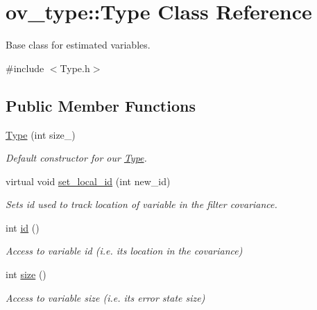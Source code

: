 \hypertarget{classov__type_1_1Type}{}\section{ov\+\_\+type\+:\+:Type Class Reference}
\label{classov__type_1_1Type}


Base class for estimated variables.  




{\ttfamily \#include $<$Type.\+h$>$}

\subsection*{Public Member Functions}
\begin{DoxyCompactItemize}
\item 
\hyperlink{classov__type_1_1Type_a512525c192c9bd721e13eef0cb707496}{Type} (int size\+\_\+)
\begin{DoxyCompactList}\small\item\em Default constructor for our \hyperlink{classov__type_1_1Type}{Type}. \end{DoxyCompactList}\item 
virtual void \hyperlink{classov__type_1_1Type_a52cb2fe6e25dbe8875da3fd618cf0b61}{set\+\_\+local\+\_\+id} (int new\+\_\+id)
\begin{DoxyCompactList}\small\item\em Sets id used to track location of variable in the filter covariance. \end{DoxyCompactList}\item 
\mbox{\label{classov__type_1_1Type_a3a23de9d85dd9a503fd72c54b948f89c}} 
int \hyperlink{classov__type_1_1Type_a3a23de9d85dd9a503fd72c54b948f89c}{id} ()
\begin{DoxyCompactList}\small\item\em Access to variable id (i.\+e. its location in the covariance) \end{DoxyCompactList}\item 
\mbox{\label{classov__type_1_1Type_a21e2cf87dcb51a7456d9d94d4e178fae}} 
int \hyperlink{classov__type_1_1Type_a21e2cf87dcb51a7456d9d94d4e178fae}{size} ()
\begin{DoxyCompactList}\small\item\em Access to variable size (i.\+e. its error state size) \end{DoxyCompactList}\item 

\end{DoxyCompactItemize}
